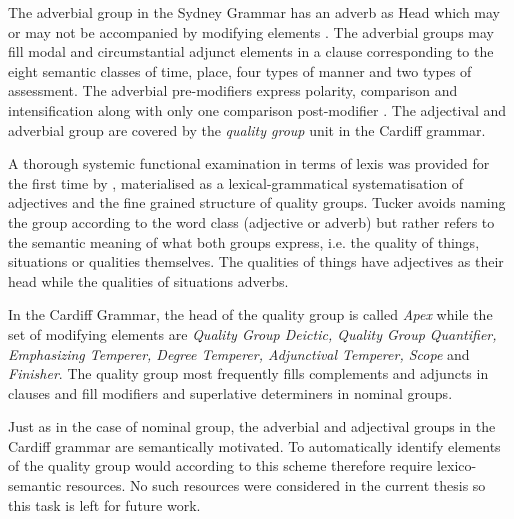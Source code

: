     
    
	
	The adverbial group in the Sydney Grammar has an adverb as Head which may or may not be accompanied by modifying elements \citep[419]{Halliday2013}. The adverbial groups may fill modal and circumstantial adjunct elements in a clause corresponding to the eight semantic classes of time, place, four types of manner and two types of assessment. The adverbial pre-modifiers express polarity, comparison and intensification along with only one comparison post-modifier \citep[420--421]{Halliday2013}. The adjectival and adverbial group are covered by the \textit{quality group} unit in the Cardiff grammar.
    
	A thorough systemic functional examination in terms of lexis was provided for the first time by \citet{Tucker1997,Tucker1998}, materialised as a lexical-grammatical systematisation of adjectives and the fine grained structure of quality groups. Tucker avoids naming the group according to the word class (adjective or adverb) but rather refers to the semantic meaning of what both groups express, i.e. the quality of things, situations or qualities themselves. The qualities of things have adjectives as their head while the qualities of situations adverbs.       
	
	In the Cardiff Grammar, the head of the quality group is called \textit{Apex} while the set of modifying elements are \textit{Quality Group Deictic, Quality Group Quantifier, Emphasizing Temperer, Degree Temperer, Adjunctival Temperer, Scope} and \textit{Finisher}. The quality group most frequently fills complements and adjuncts in clauses and fill modifiers and superlative determiners in nominal groups. 
	
	Just as in the case of nominal group, the adverbial and adjectival groups in the Cardiff grammar are semantically motivated. To automatically identify elements of the quality group would according to this scheme therefore require lexico-semantic resources. No such resources were considered in the current thesis so this task is left for future work. 
    
